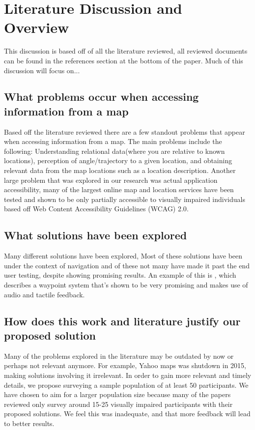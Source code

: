 \documentclass{article}
\begin{document}
\section{Literature Discussion and Overview}
This discussion is based off of all the literature reviewed, all reviewed documents can be found in the references section at the bottom of the paper. Much of this discussion will focus on...

\subsection{What problems occur when accessing information from a map}
Based off the literature reviewed there are a few standout problems that appear when accessing information from a map. The main problems include the following: Understanding relational data(where you are relative to known locations)\cite{10.1145/1168987.1169008}, perception of angle/trajectory to a given location\cite{LAHIB201816}, and obtaining relevant data from the map locations such as a location description. Another large problem that was explored in our research was actual application accessibility, many of the largest online map and location services have been tested and shown to be only partially accessible to visually impaired individuals based off Web Content Accessibility Guidelines (WCAG) 2.0\cite{10.1145/2815169.2815171}.

%
\subsection{What solutions have been explored}
Many different solutions have been explored, Most of these solutions have been under the context of navigation and of these not many have made it past the end user testing, despite showing promising results. An example of this is \cite{10.1145/2468356.2468364}, which describes a waypoint system that's shown to be very promising and makes use of audio and tactile feedback. 


\subsection{How does this work and literature justify our proposed solution}
Many of the problems explored in the literature may be outdated by now or perhaps not relevant anymore. For example, Yahoo maps was shutdown in 2015, making solutions involving it irrelevant. In order to gain more relevant and timely details, we propose surveying a sample population of at least 50 participants. We have chosen to aim for a larger population size because many of the papers reviewed only survey around 15-25 visually impaired participants with their proposed solutions. We feel this was inadequate, and that more feedback will lead to better results.
\end{document}
